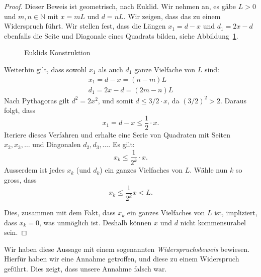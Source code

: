 \documentclass[../main.tex]{subfiles}
\begin{document}
\begin{proof}
  Dieser Beweis ist geometrisch, nach Euklid. Wir nehmen an, es gäbe $L > 0$ und
  $m,n \in \mathbb N$ mit $x = mL$ und $d = nL$. Wir zeigen, dass das zu einem Widerspruch
  führt.
  Wir stellen fest, dass die Längen $x_{1} = d-x$ und $d_{1} = 2x - d$
  ebenfalls die Seite und Diagonale eines Quadrats bilden, siehe
  Abbildung~\ref{fig:euklid}.

  \begin{figure}[htb]
    \centering
    \begin{minipage}{0.4\linewidth}
      \centering
      
    \end{minipage}%
    \begin{minipage}{0.4\linewidth}
      \centering
      
    \end{minipage}
    \caption{Euklids Konstruktion}%
    \label{fig:euklid}
  \end{figure}

  Weiterhin gilt, dass sowohl $x_{1}$ als auch $d_{1}$ ganze Vielfache von $L$ sind:
  \begin{align*}
    x_{1} = d-x = (n-m)L \\
    d_{1} = 2x-d = (2m -n)L
  \end{align*}
  Nach Pythagoras gilt $d^{2} = 2x^{2}$, und somit $d \leq 3/2\cdot x$, da ${(3/2)}^{2} > 2$.
  Daraus folgt, dass
  \[x_{1} = d - x \leq \frac{1}{2} \cdot x.\]
  Iteriere dieses Verfahren und erhalte eine Serie von Quadraten mit Seiten
  $x_{2}, x_{3}, \dots$ und Diagonalen $d_{2}, d_{3}, \dots$. Es gilt:
  \[x_{k} \leq \frac{1}{2^{k}} \cdot x.\]
  Ausserdem ist jedes $x_{k}$ (und $d_{k}$) ein ganzes Vielfaches von $L$.
  Wähle nun $k$ so gross, dass
   \[x_{k} \leq \frac{1}{2^{k}} x < L.\]

   Dies, zusammen mit dem Fakt, dass
   $x_{k}$ ein ganzes Vielfaches von $L$ ist,
   impliziert, dass $x_{k} = 0$, was unmöglich ist. Deshalb können $x$ und $d$
   nicht kommensurabel sein.
\end{proof}

Wir haben diese Aussage mit einem sogenannten \emph{Widerspruchsbeweis} bewiesen.
Hierfür haben wir eine Annahme getroffen, und diese zu einem Widerspruch geführt.
Dies zeigt, dass unsere Annahme falsch war.
\end{document}
